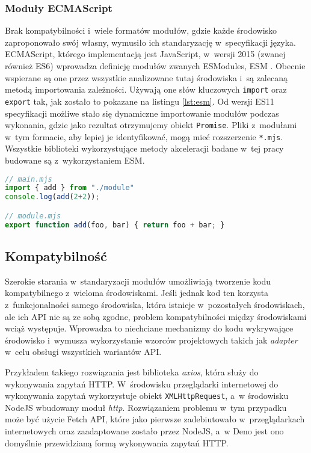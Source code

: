 \subsubsection{Moduły ECMAScript}
\label{sec:esm}

Brak kompatybilności i~wiele formatów modułów, gdzie każde środowisko zaproponowało swój własny, wymusiło ich standaryzację w~specyfikacji języka. ECMAScript, którego implementacją jest JavaScript, w~wersji 2015 (zwanej również ES6) wprowadza definicję modułów zwanych ESModules, ESM \cite{ESModules}. Obecnie wspierane są one przez wszystkie analizowane tutaj środowiska i~są zalecaną metodą importowania zależności. Używają one słów kluczowych \lstinline{import} oraz \lstinline{export} tak, jak zostało to pokazane na listingu \ref{lst:esm}. Od wersji ES11 specyfikacji możliwe stało się dynamiczne importowanie modułów podczas wykonania, gdzie jako rezultat otrzymujemy obiekt \mbox{\lstinline{Promise}}. Pliki z~modułami w~tym formacie, aby lepiej je identyfikować, mogą mieć rozszerzenie \mbox{\lstinline{*.mjs}}. Wszystkie biblioteki wykorzystujące metody akceleracji badane w~tej pracy budowane są z~wykorzystaniem ESM.

\begin{lstlisting}[language=JavaScript, caption=Przykład wykorzystania ECMAScript Modules, label=lst:esm]
// main.mjs
import { add } from "./module"
console.log(add(2+2));

// module.mjs
export function add(foo, bar) { return foo + bar; }
\end{lstlisting}

\subsection{Kompatybilność}

Szerokie starania w~standaryzacji modułów umożliwiają tworzenie kodu kompatybilnego z~wieloma środowiskami. Jeśli jednak kod ten korzysta z~funkcjonalności samego środowiska, która istnieje w~pozostałych środowiskach, ale ich API nie są ze sobą zgodne, problem kompatybilności między środowiskami wciąż występuje. Wprowadza to niechciane mechanizmy do kodu wykrywające środowisko i~wymusza wykorzystanie wzorców projektowych takich jak \textit{adapter} w~celu obsługi wszystkich wariantów API.

Przykładem takiego rozwiązania jest biblioteka \textit{axios}, która służy do wykonywania zapytań HTTP. W~środowisku przeglądarki internetowej do wykonywania zapytań wykorzystuje obiekt \lstinline{XMLHttpRequest}, a~w środowisku NodeJS wbudowany moduł \textit{http}. Rozwiązaniem problemu w~tym przypadku może być użycie Fetch API, które jako pierwsze zadebiutowało w~przeglądarkach internetowych oraz zaadaptowane zostało przez NodeJS, a~w Deno jest ono domyślnie przewidzianą formą wykonywania zapytań HTTP.

